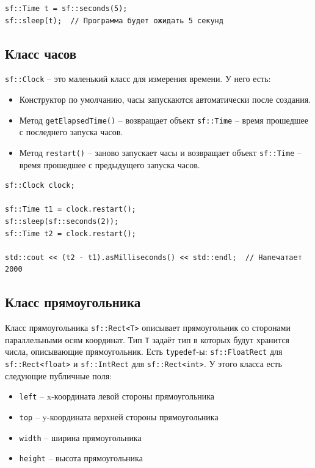 \documentclass{article}
\begin{document}
\begin{lstlisting}
sf::Time t = sf::seconds(5);
sf::sleep(t);  // Программа будет ожидать 5 секунд
\end{lstlisting}

\subsection*{Класс часов}
\texttt{sf::Clock} -- это маленький класс для измерения времени. У него есть:
\begin{itemize}
\item Конструктор по умолчанию, часы запускаются автоматически после создания.
\item Метод \texttt{getElapsedTime()} -- возвращает объект \texttt{sf::Time} -- время прошедшее с последнего запуска часов.
\item Метод \texttt{restart()} -- заново запускает часы и возвращает объект \texttt{sf::Time} -- время прошедшее с предыдущего запуска часов.
\end{itemize}

\begin{lstlisting}
sf::Clock clock;

sf::Time t1 = clock.restart();
sf::sleep(sf::seconds(2));
sf::Time t2 = clock.restart();
    
std::cout << (t2 - t1).asMilliseconds() << std::endl;  // Напечатает 2000
\end{lstlisting}


\newpage



\subsection*{Класс прямоугольника}
Класс прямоугольника \texttt{sf::Rect<T>} описывает прямоугольник со сторонами параллельными осям координат.
Тип \texttt{T} задаёт тип в которых будут хранится числа, описывающие прямоугольник. Есть \texttt{typedef}-ы: \texttt{sf::FloatRect} для \texttt{sf::Rect<float>} и \texttt{sf::IntRect} для \texttt{sf::Rect<int>}.
У этого класса есть следующие публичные поля:
\begin{itemize}
\item \texttt{left} -- x-координата левой стороны прямоугольника 
\item \texttt{top} -- y-координата верхней стороны прямоугольника 
\item \texttt{width} -- ширина прямоугольника
\item \texttt{height} -- высота прямоугольника
\end{itemize}
\end{document}
